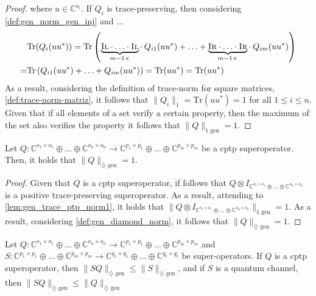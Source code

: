 \begin{proof}
where $u \in \mathbb{C}^{o_i}$.
If $Q_i$ is trace-preserving, then considering \autoref{def:gen_norm_gen_inj} and ...
\begin{equation}
  \begin{split}
  &\text{Tr} (Q_i(u u^{*})) =  \text{Tr} \left( \underbrace{\textsc{Il} \cdot \ldots \cdot \textsc{Il}}_{m-1 \times } \cdot \hspace{2pt} Q_{i1} (u u^{*}) + \ldots + \underbrace{\textsc{Ir} \cdot \ldots \cdot \textsc{Ir}}_{m-1 \times } \cdot  \hspace{2pt} Q_{im}(u u^{*}) \right) \\
  =&   \text{Tr} \left( Q_{i1} (u u^{*}) + \ldots + Q_{im}(u u^{*}) \right) = \text{Tr} (u u^{*}) = \text{Tr} (u u^{*})
\end{split}
\end{equation}
As a result, considering the definition of trace-norm for square matrices, \autoref{def:trace-norm-matriz},  it follows that $\lVert Q_i \rVert_{1} = \text{Tr} (u u^{*}) = 1$ for all $1 \leq i \leq n$. Given that if all elements of a set verify a certain property, then the maximum of the set also verifies the property it follows that $\lVert Q \rVert_{1 \text{ gen}} = 1$.

\end{proof}

\begin{lemma} \label{lem:gen_diamond_cptp_norm}
  Let  $Q: \mathbb{C}^{o_1 \times o_1} \oplus \ldots \oplus \mathbb{C}^{o_n \times o_n}  \rightarrow \mathbb{C}^{p_1 \times p_1} \oplus \ldots \oplus  \mathbb{C}^{p_m \times p_m}$ be a \acrshort{cptp} superoperator. Then, it holds that $\lVert Q \rVert_{\diamondsuit \text{ gen}} = 1$.
\end{lemma}

\begin{proof}
  Given that $Q$ is a \acrshort{cptp} superoperator, if follows that $ Q \otimes I_{\mathbb{C}^{o_1 \times o_1} \oplus \ldots \oplus \mathbb{C}^{o_n \times o_n}}$ is a positive trace-preserving superoperator. As a result, attending to \autoref{lem:gen_trace_ptp_norm1}, it holds that $\lVert Q \otimes I_{\mathbb{C}^{o_1 \times o_1} \oplus \ldots \oplus \mathbb{C}^{o_n \times o_n}} \rVert_{1 \text{ gen}} = 1$. As a result, considering  \autoref{def:gen_diamond_norm}, it follows that $\lVert Q \rVert_{\diamondsuit \text{ gen}} = 1$.
\end{proof}

\begin{theorem}
  Let  $Q: \mathbb{C}^{o_1 \times o_1} \oplus \ldots \oplus \mathbb{C}^{o_n \times o_n}  \rightarrow \mathbb{C}^{p_1 \times p_1} \oplus \ldots \oplus  \mathbb{C}^{p_m \times p_m}$ and $S: \mathbb{C}^{p_1 \times p_1} \oplus \ldots \oplus \mathbb{C}^{p_m \times p_m}  \rightarrow \mathbb{C}^{q_1 \times q_1} \oplus \ldots \oplus \mathbb{C}^{q_t \times q_t}$ be super-operators. If $Q$ is a \acrshort{cptp} superoperator, then $\lVert S  Q \rVert_{\diamondsuit \text{ gen}} \leq \lVert S \rVert_{\diamondsuit \text{ gen}}$, and if $S$ is a quantum channel, then $\lVert S  Q \rVert_{\diamondsuit \text{ gen}} \leq \lVert Q \rVert_{\diamondsuit \text{ gen}}$
\end{theorem}


